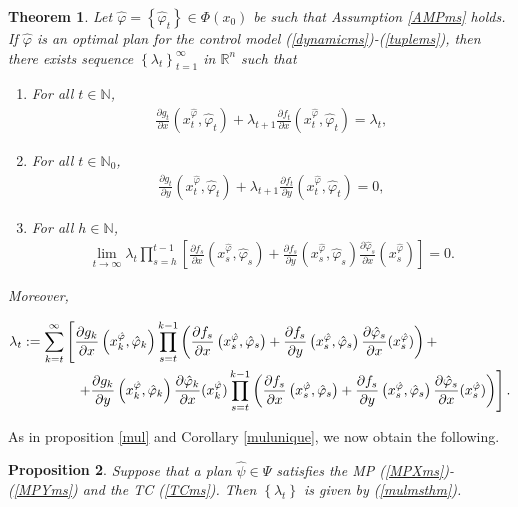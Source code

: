 \documentclass[3p]{elsarticle}
\newcommand{\rzn}{\mathbb R^{n}}
\newcommand{\nat}{\mathbb N_0}
\newcommand{\natu}{\mathbb N}
\newtheorem{thm}{Theorem}
\newtheorem{prop}[thm]{Proposition}
\begin{document}
	\begin{thm}\label{MPms}
		Let $\hat \varphi=\left\lbrace\hat\varphi_t \right\rbrace \in\varPhi(x_0)$ be such that Assumption \ref{AMPms} holds. If $\hat\varphi$ is an optimal plan for the control model (\ref{dynamicms})-(\ref{tuplems}), then there exists  sequence $\left\lbrace \lambda_t\right\rbrace_{t=1}^\infty$ in $\rzn$ such that
		\begin{enumerate}
			\item[(a)] For all $t\in\natu$,
			\begin{align}\label{MPXms}
			\frac{\partial g_t}{\partial x}(x_t^{\hat\varphi},\hat\varphi_t)+\lambda_{t+1}\frac{\partial f_t}{\partial x}(x_t^{\hat\varphi},\hat\varphi_t)=\lambda_t,
			\end{align}
			\item[(b)] For all $t\in\nat$,
			\begin{align}\label{MPYms}
			\frac{\partial g_t}{\partial y}(x_t^{\hat\varphi},\hat\varphi_t)+\lambda_{t+1}\frac{\partial f_t}{\partial y}(x_t^{\hat\varphi},\hat\varphi_t)=0,
			\end{align}
			\item[(c)] For all $h\in\natu$,
			\begin{align}\label{TCms}
			\lim_{t\to\infty}\lambda_t \prod_{s=h}^{t-1}\left[ \frac{\partial f_s}{\partial x}\left( x_s^{\hat\varphi},\hat \varphi_s\right)+\frac{\partial f_s}{\partial y}\left( x_s^{\hat\varphi},\hat \varphi_s\right)\frac{\partial \hat\varphi_s}{\partial x}(x_s^{\hat\varphi})\right]=0.
			\end{align}  
		\end{enumerate}
		Moreover,
		
		
		\begin{equation} \label{mulmsthm}
		\begin{split}
		&\lambda_{t}:=\sum_{k=t}^\infty\left[ \frac{\partial g_k}{\partial x}\left( x_k^{\hat\varphi},\hat \varphi_k\right)\prod_{s=t}^{k-1}\left(  \frac{\partial f_s}{\partial x}\left( x_s^{\hat\varphi},\hat \varphi_s\right)+\frac{\partial f_s}{\partial y}\left( x_s^{\hat\varphi},\hat \varphi_s\right)\frac{\partial \hat\varphi_s}{\partial x}(x_s^{\hat\varphi})\right) +\right.\\
		&\hspace{1.7cm}\left.+\frac{\partial g_k}{\partial y}\left( x_k^{\hat\varphi},\hat \varphi_k\right)\frac{\partial \hat\varphi_k}{\partial x}(x_k^{\hat\varphi})\prod_{s=t}^{k-1}\left(  \frac{\partial f_s}{\partial x}\left( x_s^{\hat\varphi},\hat \varphi_s\right)+\frac{\partial f_s}{\partial y}\left( x_s^{\hat\varphi},\hat \varphi_s\right)\frac{\partial \hat\varphi_s}{\partial x}(x_s^{\hat\varphi})\right) \right].
		\end{split}
		\end{equation}
		
		
	\end{thm}
	As in proposition \ref{mul} and Corollary \ref{mulunique}, we now obtain the following.
	\begin{prop}\label{mulms}
		Suppose that a plan $\hat\psi\in \Psi$ satisfies the MP (\ref{MPXms})-(\ref{MPYms}) and the TC (\ref{TCms}). Then $\left\lbrace \lambda_t\right\rbrace $ is given by (\ref{mulmsthm}). 
	\end{prop}
	
\end{document}
